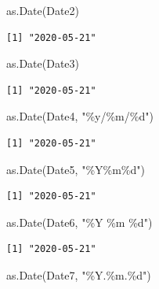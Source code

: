 \documentclass[
  a4paper,
  pandoc,
  ja=standard,
  jafont=haranoaji]{bxjsbook}
\newenvironment{Shaded}{\begin{snugshade}}{\end{snugshade}}
\newcommand{\FunctionTok}[1]{\textcolor[rgb]{0.28,0.35,0.67}{#1}}
\newcommand{\NormalTok}[1]{\textcolor[rgb]{0.00,0.48,0.65}{#1}}
\newcommand{\StringTok}[1]{\textcolor[rgb]{0.13,0.47,0.30}{#1}}
\begin{document}
\begin{Shaded}
\begin{Highlighting}[numbers=left,,]
\FunctionTok{as.Date}\NormalTok{(Date2)}
\end{Highlighting}
\end{Shaded}

\begin{verbatim}
[1] "2020-05-21"
\end{verbatim}

\begin{Shaded}
\begin{Highlighting}[numbers=left,,]
\FunctionTok{as.Date}\NormalTok{(Date3)}
\end{Highlighting}
\end{Shaded}

\begin{verbatim}
[1] "2020-05-21"
\end{verbatim}

\begin{Shaded}
\begin{Highlighting}[numbers=left,,]
\FunctionTok{as.Date}\NormalTok{(Date4, }\StringTok{"\%y/\%m/\%d"}\NormalTok{)}
\end{Highlighting}
\end{Shaded}

\begin{verbatim}
[1] "2020-05-21"
\end{verbatim}

\begin{Shaded}
\begin{Highlighting}[numbers=left,,]
\FunctionTok{as.Date}\NormalTok{(Date5, }\StringTok{"\%Y\%m\%d"}\NormalTok{)}
\end{Highlighting}
\end{Shaded}

\begin{verbatim}
[1] "2020-05-21"
\end{verbatim}

\begin{Shaded}
\begin{Highlighting}[numbers=left,,]
\FunctionTok{as.Date}\NormalTok{(Date6, }\StringTok{"\%Y \%m \%d"}\NormalTok{)}
\end{Highlighting}
\end{Shaded}

\begin{verbatim}
[1] "2020-05-21"
\end{verbatim}

\begin{Shaded}
\begin{Highlighting}[numbers=left,,]
\FunctionTok{as.Date}\NormalTok{(Date7, }\StringTok{"\%Y.\%m.\%d"}\NormalTok{)}
\end{Highlighting}
\end{Shaded}
\end{document}
